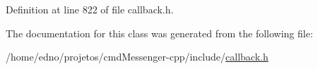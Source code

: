 Definition at line 822 of file callback.\+h.



The documentation for this class was generated from the following file\+:\begin{DoxyCompactItemize}
\item 
/home/edno/projetos/cmd\+Messenger-\/cpp/include/\hyperlink{callback_8h}{callback.\+h}\end{DoxyCompactItemize}
